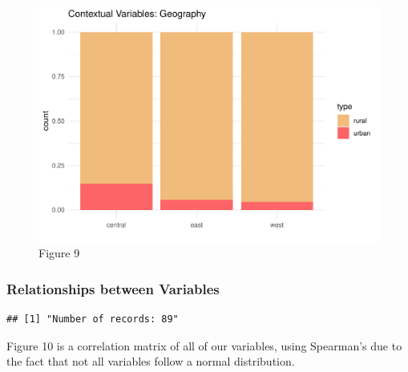 \documentclass[]{article}
\newenvironment{Shaded}{\begin{snugshade}}{\end{snugshade}}
\newcommand{\CommentTok}[1]{\textcolor[rgb]{0.56,0.35,0.01}{\textit{#1}}}
\newcommand{\DecValTok}[1]{\textcolor[rgb]{0.00,0.00,0.81}{#1}}
\newcommand{\KeywordTok}[1]{\textcolor[rgb]{0.13,0.29,0.53}{\textbf{#1}}}
\newcommand{\NormalTok}[1]{#1}
\newcommand{\OperatorTok}[1]{\textcolor[rgb]{0.81,0.36,0.00}{\textbf{#1}}}
\newcommand{\StringTok}[1]{\textcolor[rgb]{0.31,0.60,0.02}{#1}}
\begin{document}
\begin{figure}

{\centering \includegraphics{lab_3_v7_files/figure-latex/unnamed-chunk-29-1} 

}

\caption{Figure 9}\label{fig:unnamed-chunk-29}
\end{figure}

\hypertarget{relationships-between-variables}{%
\subsubsection{Relationships between
Variables}\label{relationships-between-variables}}

\begin{Shaded}
\end{Shaded}

\begin{verbatim}
## [1] "Number of records: 89"
\end{verbatim}

Figure 10 is a correlation matrix of all of our variables, using
Spearman's due to the fact that not all variables follow a normal
distribution.
\end{document}
